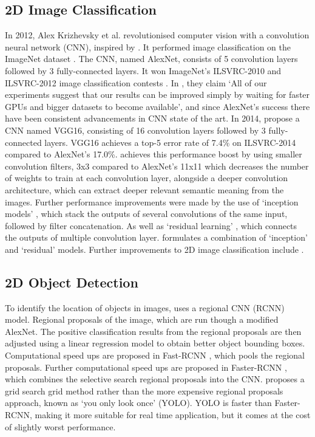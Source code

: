 \documentclass[11pt]{article}
\begin{document}
\subsection*{2D Image Classification}
In 2012, Alex Krizhevsky et al. revolutionised computer vision with a convolution neural network (CNN), inspired by \cite{Yann}. It performed image classification on the ImageNet dataset \cite{ILSVRC15}. The CNN, named AlexNet, consists of 5 convolution layers followed by 3 fully-connected layers. It won ImageNet's ILSVRC-2010 and ILSVRC-2012 image classification contests \cite{alex_net}. In \cite{alex_net}, they claim `All of our experiments suggest that our results can be improved simply by waiting for faster GPUs and bigger datasets to become available', and since AlexNet's success there have been consistent advancements in CNN state of the art. In 2014, \cite{VGG16} propose a CNN named VGG16, consisting of 16 convolution layers followed by 3 fully-connected layers. VGG16 achieves a top-5 error rate of 7.4\% on ILSVRC-2014 compared to AlexNet's 17.0\%. \cite{VGG16} achieves this performance boost by using smaller convolution filters, 3x3 compared to AlexNet's 11x11 which decreases the number of weights to train at each convolution layer, alongside a deeper convolution architecture, which can extract deeper relevant semantic meaning from the images. Further performance improvements were made by the use of `inception models' \cite{inception}\cite{inceptionV2}, which stack the outputs of several convolutions of the same input, followed by filter concatenation. As well as `residual learning' \cite{ResNet}, which connects the outputs of multiple convolution layer. \cite{Incep_ResNet} formulates a combination of `inception' and `residual' models. Further improvements to 2D image classification include \cite{neural_search} \cite{scaleable_image}.

\subsection*{2D Object Detection}
To identify the location of objects in images, \cite{RNN} uses a regional CNN (RCNN) model. Regional proposals of the image, which are run though a modified AlexNet. The positive classification results from the regional proposals are then adjusted using a linear regression model to obtain better object bounding boxes. Computational speed ups are proposed in Fast-RCNN \cite{fast_RNN}, which pools the regional proposals. Further computational speed ups are proposed in Faster-RCNN \cite{faster_RNN}, which combines the selective search regional proposals into the CNN. \cite{YOLO} proposes a grid search grid method rather than the more expensive regional proposals approach, known as `you only look once' (YOLO). YOLO is faster than Faster-RCNN, making it more suitable for real time application, but it comes at the cost of slightly worst performance.
\end{document}

